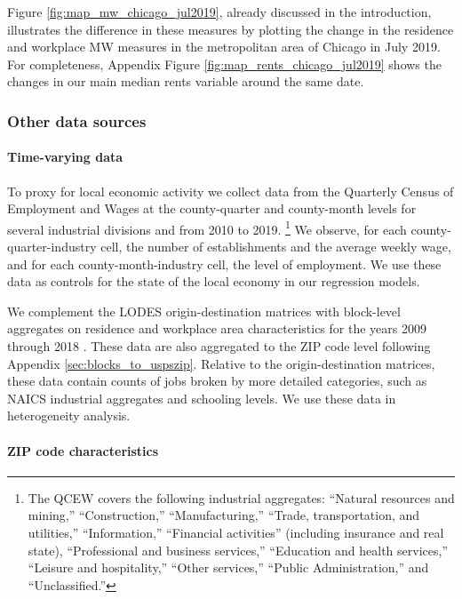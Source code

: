 Figure \ref{fig:map_mw_chicago_jul2019}, already discussed in the introduction,
illustrates the difference in these measures by plotting the change in the 
residence and workplace MW measures in the metropolitan area of Chicago in 
July 2019.
For completeness, Appendix Figure \ref{fig:map_rents_chicago_jul2019} shows
the changes in our main median rents variable around the same date.


\subsubsection{Other data sources}\label{sec:data_other}

\paragraph{Time-varying data}

To proxy for local economic activity we collect data from the 
Quarterly Census of Employment and Wages \parencite[QCEW;][]{QCEW} 
at the county-quarter and county-month levels for several industrial divisions 
and from 2010 to 2019.%
\footnote{The QCEW covers the following industrial aggregates: 
``Natural resources and mining,'' ``Construction,'' ``Manufacturing,'' 
``Trade, transportation, and utilities,'' ``Information,'' 
``Financial activities'' (including insurance and real state), 
``Professional and business services,'' ``Education and health services,'' 
``Leisure and hospitality,'' ``Other services,'' ``Public Administration,''
and ``Unclassified.''}
We observe, for each county-quarter-industry cell, the number of establishments 
and the average weekly wage, and 
for each county-month-industry cell, the level of employment.
We use these data as controls for the state of the local economy in our 
regression models.

We complement the LODES origin-destination matrices with block-level aggregates 
on residence and workplace area characteristics for the years 2009 through 2018 
\parencite{CensusLODES}.
These data are also aggregated to the ZIP code level following Appendix 
\ref{sec:blocks_to_uspszip}.
Relative to the origin-destination matrices, these data contain counts of jobs 
broken by more detailed categories, such as NAICS industrial aggregates and 
schooling levels.
We use these data in heterogeneity analysis.

\paragraph{ZIP code characteristics}

